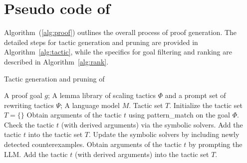 \section{Pseudo code of \name} \label{app:algorithm}

Algorithm~(\ref{alg:proof}) outlines the overall process of \name proof generation. The detailed steps for tactic generation and pruning are provided in Algorithm~\ref{alg:tactic}, while the specifics for goal filtering and ranking are described in Algorithm~\ref{alg:rank}.

\begin{algorithm}[h] 
\caption{Tactic generation and pruning of \name} 
\label{alg:tactic}
\begin{algorithmic}[1]
\Require A proof goal $g$; A lemma library of scaling tactics $\Phi$ and a prompt set of rewriting tactics $\Psi$; A language model $M$.
\Ensure Tactic set $T$.
\State Initialize the tactic set $T = \{\}$
    \State Obtain arguments of the tactic $t$ using {pattern\_match} on the goal $\Phi$.
    \State Check the tactic $t$ (with derived arguments) via the symbolic solvers.
     {}
    \State Add the tactic $t$ into the tactic set $T$.
    \Else 
    \State Update the symbolic solvers by including newly detected counterexamples.
    \EndIf
\EndFor
{}
    \State Obtain arguments of the tactic $t$ by prompting the LLM.
    \State Add the tactic $t$ (with derived arguments) into the tactic set $T$.
\EndFor
\end{algorithmic}
\end{algorithm}

